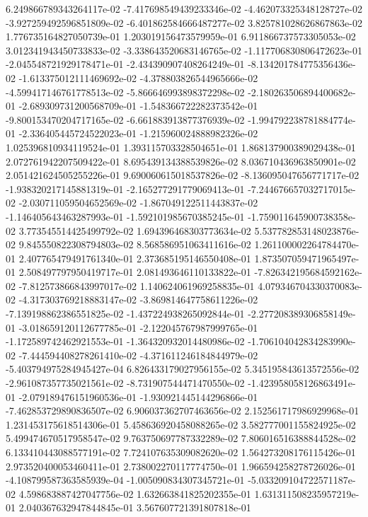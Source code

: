 6.249866789343264117e-02
-7.417698549439233346e-02
-4.462073325348128727e-02
-3.927259492596851809e-02
-6.401862584666487277e-02
3.825781028626867863e-02
1.776735164827050739e-01
1.203019156473579959e-01
6.911866737573305053e-02
3.012341943450733833e-02
-3.338643520683146765e-02
-1.117706830806472623e-01
-2.045548721929178471e-01
-2.434390907408264249e-01
-8.134201784775356436e-02
-1.613375012111469692e-02
-4.378803826544965666e-02
-4.599417146761778513e-02
-5.866646993898372298e-02
-2.180263506894400682e-01
-2.689309731200568709e-01
-1.548366722282373542e-01
-9.800153470204717165e-02
-6.661883913877376939e-02
-1.994792238781884774e-01
-2.336405445724522023e-01
-1.215960024888982326e-02
1.025396810934119524e-01
1.393115703328504651e-01
1.868137900389029438e-01
2.072761942207509422e-01
8.695439134388539826e-02
8.036710436963850901e-02
2.051421624505255226e-01
9.690060615018537826e-02
-8.136095047656771717e-02
-1.938320217145881319e-01
-2.165277291779069413e-01
-7.244676657032717015e-02
-2.030711059504652569e-02
-1.867049122511443837e-02
-1.146405643463287993e-01
-1.592101985670385245e-01
-1.759011645900738358e-02
3.773545514425499792e-02
1.694396468303773634e-02
5.537782853148023876e-02
9.845550822308794803e-02
8.568586951063411616e-02
1.261100002264784470e-01
2.407765479491761340e-01
2.373685195146550408e-01
1.873507059471965497e-01
2.508497797950419717e-01
2.081493646110133822e-01
-7.826342195684592162e-02
-7.812573866843997017e-02
1.140624061969258835e-01
4.079346704330370083e-02
-4.317303769218883147e-02
-3.869814647758611226e-02
-7.139198862386551825e-02
-1.437224938265092844e-01
-2.277208389306858149e-01
-3.018659120112677785e-01
-2.122045767987999765e-01
-1.172589742462921553e-01
-1.364320932014480986e-02
-1.706104042834283990e-02
-7.444594408278261410e-02
-4.371611246184844979e-02
-5.403794975284945427e-04
6.826433179027956155e-02
5.345195843613572556e-02
-2.961087357735021561e-02
-8.731907544471470550e-02
-1.423958058126863491e-01
-2.079189476151960536e-01
-1.930921445144296866e-01
-7.462853729890836507e-02
6.906037362707463656e-02
2.152561717986929968e-01
1.231453175618514306e-01
5.458636920458088265e-02
3.582777001155824925e-02
5.499474670517958547e-02
9.763750697787332289e-02
7.806016516388844528e-02
6.133410443088577191e-02
7.724107635309082620e-02
1.564273208176115426e-01
2.973520400053460411e-01
2.738002270117774750e-01
1.966594258278726026e-01
-4.108799587363585939e-04
-1.005090834307345721e-01
-5.033209104722571187e-02
4.598683887427047756e-02
1.632663841825202355e-01
1.631311508235957219e-01
2.040367632947844845e-01
3.567607721391807818e-01
